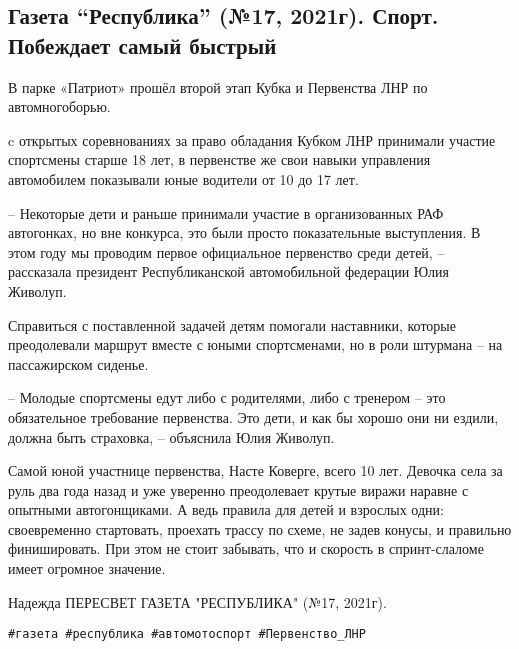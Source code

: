  
 
 
 
 
\subsection{Газета \enquote{Республика} (№17, 2021г).  Спорт.  Побеждает самый быстрый}

В парке «Патриот» прошёл второй этап Кубка и Первенства ЛНР по автомногоборью.

c открытых соревнованиях за право обладания Кубком ЛНР принимали участие
спортсмены старше 18 лет, в первенстве же свои навыки управления автомобилем
показывали юные водители от 10 до 17 лет.

– Некоторые дети и раньше принимали участие в организованных РАФ автогонках, но
вне конкурса, это были просто показательные выступления. В этом году мы
проводим первое официальное первенство среди детей, – рассказала президент
Республиканской автомобильной федерации Юлия Живолуп.

Справиться с поставленной задачей детям помогали наставники, которые
преодолевали маршрут вместе с юными спортсменами, но в роли штурмана – на
пассажирском сиденье.

– Молодые спортсмены едут либо с родителями, либо с тренером – это обязательное
требование первенства. Это дети, и как бы хорошо они ни ездили, должна быть
страховка, – объяснила Юлия Живолуп.

Самой юной участнице первенства, Насте Коверге, всего 10 лет. Девочка села за
руль два года назад и уже уверенно преодолевает крутые виражи наравне с
опытными автогонщиками. А ведь правила для детей и взрослых одни: своевременно
стартовать, проехать трассу по схеме, не задев конусы, и правильно
финишировать. При этом не стоит забывать, что и скорость в спринт-слаломе имеет
огромное значение.

Надежда ПЕРЕСВЕТ ГАЗЕТА "РЕСПУБЛИКА" (№17, 2021г).

\verb|#газета #республика #автомотоспорт #Первенство_ЛНР|
